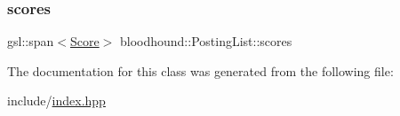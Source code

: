 \mbox{\label{classbloodhound_1_1PostingList_a2c773bffa3d78d2e7a7e04d918b064da}} 
\subsubsection{\texorpdfstring{scores}{scores}}
{\footnotesize\ttfamily gsl\+::span$<$\hyperlink{structbloodhound_1_1Score}{Score}$>$ bloodhound\+::\+Posting\+List\+::scores}



The documentation for this class was generated from the following file\+:\begin{DoxyCompactItemize}
\item 
include/\hyperlink{index_8hpp}{index.\+hpp}\end{DoxyCompactItemize}
